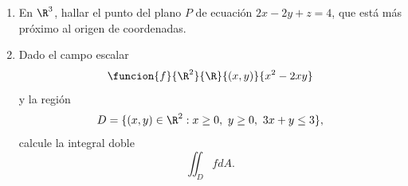 \documentclass[a4,11pt]{aleph-examen}
\begin{document}
\begin{preguntas}
\begin{respuesta}
\begin{respuesta}
\begin{respuesta}
\begin{enumerate}
\item
    En $\R^3$, hallar el punto del plano $P$ de ecuación $2x-2y+z=4$, que está más próximo al origen de coordenadas.



\item 
	Dado el campo escalar 
	\[
		\funcion{f}{\R^2}{\R}{(x,y)}{x^2-2xy}
	\] 
	y la región
	\[
		D=\{(x,y)\in\R^2: x \geq 0, \ y \geq 0, \ 3x + y \leq 3\},
	\]
	calcule la integral doble
	\[
		\iint_D f dA.
	\]


\end{enumerate}
\end{respuesta}
\end{respuesta}
\end{respuesta}
\end{preguntas}
\end{document}
